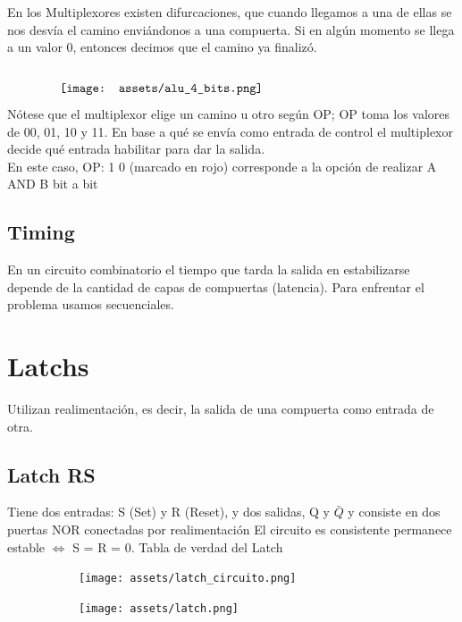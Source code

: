 \documentclass[10pt,a4paper]{article}
\begin{document}
En los Multiplexores existen difurcaciones, que cuando llegamos a una de ellas se nos desvía el camino enviándonos a una compuerta. Si en algún momento se llega a un valor 0, entonces decimos que el camino ya finalizó.\\
\\
\[\begin{minipage}[b]{0.8\textwidth}
    \texttt{[image: assets/alu\_4\_bits.png]}
    
    \label{fig:alu_4_bits}
\end{minipage}\]
Nótese que el multiplexor elige un camino u otro según OP; OP toma los valores de 00, 01, 10 y 11. En base a qué se envía como entrada de control el multiplexor decide qué entrada habilitar para dar la salida. \\
En este caso, OP: 1 0 (marcado en rojo) corresponde a la opción de realizar A AND B bit a bit

\subsection*{Timing}
En un circuito combinatorio el tiempo que tarda la salida en estabilizarse depende de la cantidad de capas de compuertas (latencia). Para enfrentar el problema usamos secuenciales.

\section*{Latchs}
Utilizan realimentación, es decir, la salida de una compuerta como entrada de otra.
\subsection*{Latch RS}
Tiene dos entradas: S (Set) y R (Reset), y dos salidas, Q y \(\bar{Q}\) y consiste en dos puertas NOR conectadas por realimentación
El circuito es consistente permanece estable \(\iff\) S = R = 0.
Tabla de verdad del Latch
\begin{figure}[h]
    \begin{subfigure}{0.4\textwidth}
        \centering
        \texttt{[image: assets/latch\_circuito.png]}
        \label{fig:latch_circuito}
        \end{subfigure}
    \begin{subfigure}{0.5\textwidth}
        \centering
    \texttt{[image: assets/latch.png]}
    \label{fig:latch}
    \end{subfigure}
    \end{figure}
    
\end{document}

